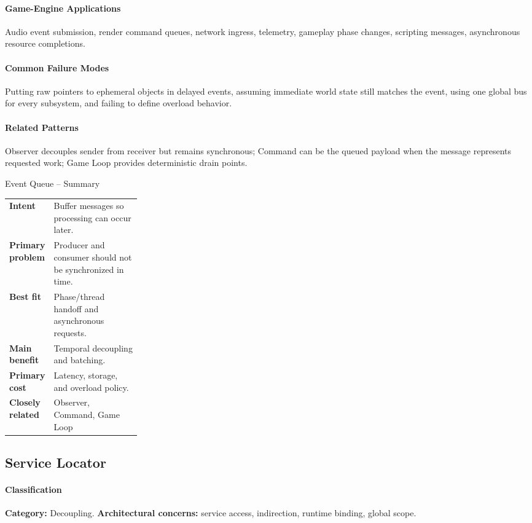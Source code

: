 \documentclass[11pt]{article}
\begin{document}
\paragraph{Game-Engine Applications} Audio event submission, render command queues, network ingress, telemetry, gameplay phase changes, scripting messages, asynchronous resource completions.
\paragraph{Common Failure Modes} Putting raw pointers to ephemeral objects in delayed events, assuming immediate world state still matches the event, using one global bus for every subsystem, and failing to define overload behavior.
\paragraph{Related Patterns} Observer decouples sender from receiver but remains synchronous; Command can be the queued payload when the message represents requested work; Game Loop provides deterministic drain points.

\begin{patternsummary}{Event Queue -- Summary}
\begin{tabularx}{\linewidth}{@{}>{\bfseries}p{0.25\linewidth}X@{}}
Intent & Buffer messages so processing can occur later. \\
Primary problem & Producer and consumer should not be synchronized in time. \\
Best fit & Phase/thread handoff and asynchronous requests. \\
Main benefit & Temporal decoupling and batching. \\
Primary cost & Latency, storage, and overload policy. \\
Closely related & Observer, Command, Game Loop \\
\end{tabularx}
\end{patternsummary}

\subsection{Service Locator}\label{pat:service-locator}
\paragraph{Classification} \textbf{Category:} Decoupling. \textbf{Architectural concerns:} service access, indirection, runtime binding, global scope.
\end{document}
